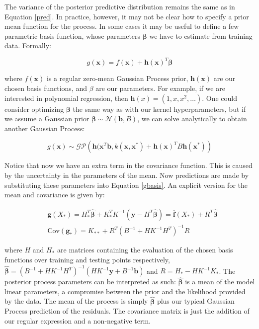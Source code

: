 \documentclass[10pt,a4paper,twoside]{book}
\begin{document}
The variance of the posterior predictive distribution remains the same as in Equation \ref{pred}. In practice, however, it may not be clear how to specify a prior mean function for the process. In some cases it may be useful to define a few parametric basis function, whose parameters $\boldsymbol{\beta}$ we have to estimate from training data. Formally:

\begin{equation}
\label{gbasis}
g(\boldsymbol{x}) = f(\boldsymbol{x}) + \boldsymbol{h}(\boldsymbol{x})^T\boldsymbol{\beta}
\end{equation}

where $f(\boldsymbol{x})$ is a regular zero-mean Gaussian Process prior, $\boldsymbol{h}(\boldsymbol{x})$ are our chosen basis functions, and $\beta$ are our parameters. For example, if we are interested in polynomial regression, then $\boldsymbol{h}(x) = (1, x, x^2, \dots)$. One could consider optimizing $\boldsymbol{\beta}$ the same way as with our kernel hyperparameters, but if we assume a Gaussian prior $\boldsymbol{\beta} \sim \mathcal{N}(\boldsymbol{b}, B)$, we can solve analytically to obtain another Gaussian Process:

\begin{equation}
g(\boldsymbol{x}) \sim \mathcal{G}\mathcal{P}\left(\boldsymbol{h}(\boldsymbol{x}^T\boldsymbol{b}, k(\boldsymbol{x}, \boldsymbol{x}^*) + \boldsymbol{h}(\boldsymbol{x})^T B \boldsymbol{h}(\boldsymbol{x}^*)\right)
\end{equation} 

Notice that now we have an extra term in the covariance function. This is caused by the uncertainty in the parameters of the mean. Now predictions are made by substituting these parameters into Equation \ref{gbasis}. An explicit version for the mean and covariance is given by:

\begin{align}
&\overline{\boldsymbol{g}}(X_*) = H^T_* \hat{\boldsymbol{\beta}} + K_*^T K^{-1}(\boldsymbol{y} - H^T\hat{\boldsymbol{\beta}}) = \overline{\boldsymbol{f}}(X_*) + R^T\hat{\boldsymbol{\beta}}\\
&\mathrm{Cov}(\boldsymbol{g_*}) = K_{**} + R^T(B^{-1} + HK^{-1}H^T)^{-1}R
\end{align}

where $H$ and $H_*$ are matrices containing the evaluation of the chosen basis functions over training and testing points respectively, $\hat{\boldsymbol{\beta}} = (B^{-1} + H K^{-1} H^T)^{-1}(H K^{-1}\boldsymbol{y} + B^{-1}\boldsymbol{b})$ and $R = H_* - HK^{-1}K_{*}$. The posterior process parameters can be interpreted as such: $\hat{\boldsymbol{\beta}}$ is a mean of the model linear parameters, a compromise between the prior and the likelihood provided by the data. The mean of the process is simply $\hat{\boldsymbol{\beta}}$ plus our typical Gaussian Process prediction of the residuals. The covariance matrix is just the addition of our regular expression and a non-negative term.\\
\end{document}
